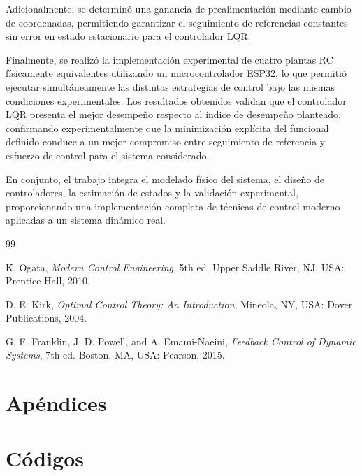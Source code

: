 \documentclass[12pt,letterpaper,twoside]{article}
\begin{document}
Adicionalmente, se determinó una ganancia de prealimentación mediante cambio de coordenadas, permitiendo garantizar el seguimiento de referencias constantes sin error en estado estacionario para el controlador LQR.

Finalmente, se realizó la implementación experimental de cuatro plantas RC físicamente equivalentes utilizando un microcontrolador ESP32, lo que permitió ejecutar simultáneamente las distintas estrategias de control bajo las mismas condiciones experimentales. Los resultados obtenidos validan que el controlador LQR presenta el mejor desempeño respecto al índice de desempeño planteado, confirmando experimentalmente que la minimización explícita del funcional definido conduce a un mejor compromiso entre seguimiento de referencia y esfuerzo de control para el sistema considerado.

En conjunto, el trabajo integra el modelado físico del sistema, el diseño de controladores, la estimación de estados y la validación experimental, proporcionando una implementación completa de técnicas de control moderno aplicadas a un sistema dinámico real.


\begin{thebibliography}{99}

K. Ogata,
\textit{Modern Control Engineering},
5th ed.
Upper Saddle River, NJ, USA:
Prentice Hall, 2010.

D. E. Kirk,
\textit{Optimal Control Theory: An Introduction},
Mineola, NY, USA:
Dover Publications, 2004.

G. F. Franklin, J. D. Powell, and A. Emami-Naeini,
\textit{Feedback Control of Dynamic Systems},
7th ed.
Boston, MA, USA:
Pearson, 2015.

\end{thebibliography}

\newpage
\appendix

\section*{Apéndices}

\section{Códigos}
\end{document}
